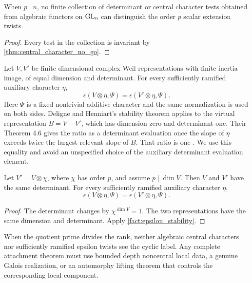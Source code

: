 \begin{corollary}\label{cor:rank_sieve_optimal}
When \(p\mid n\), no finite collection of determinant or central character tests obtained from algebraic functors on \(\operatorname{GL}_n\) can distinguish the order \(p\) scalar extension twists.
\end{corollary}

\begin{proof}
Every test in the collection is invariant by \cref{thm:central_character_no_go}.
\end{proof}

\begin{standardfact}\label{fact:epsilon_stability}
Let \(V,V'\) be finite dimensional complex Weil representations with finite inertia image, of equal dimension and determinant. For every sufficiently ramified auxiliary character \(\eta\),
\[
 \epsilon(V\otimes\eta,\Psi)=\epsilon(V'\otimes\eta,\Psi).
\]
Here \(\Psi\) is a fixed nontrivial additive character and the same normalization is used on both sides. Deligne and Henniart's stability theorem applies to the virtual representation \(B=V-V'\), which has dimension zero and determinant one. Their Theorem 4.6 gives the ratio as a determinant evaluation once the slope of \(\eta\) exceeds twice the largest relevant slope of \(B\). That ratio is one \cite{DeligneHenniart1981}. We use this equality and avoid an unspecified choice of the auxiliary determinant evaluation element.
\end{standardfact}

\begin{theorem}\label{thm:epsilon_no_go}
Let \(V' = V\otimes\chi\), where \(\chi\) has order \(p\), and assume \(p\mid\dim V\). Then \(V\) and \(V'\) have the same determinant. For every sufficiently ramified auxiliary character \(\eta\),
\[
\boxed{
 \epsilon(V\otimes\eta,\Psi)
 =
 \epsilon(V'\otimes\eta,\Psi).
}
\]
\end{theorem}

\begin{proof}
The determinant changes by \(\chi^{\dim V}=1\). The two representations have the same dimension and determinant. Apply \cref{fact:epsilon_stability}.
\end{proof}

\begin{remark}\label{rem:no_go_boundary}
When the quotient prime divides the rank, neither algebraic central characters nor sufficiently ramified epsilon twists see the cyclic label. Any complete attachment theorem must use bounded depth noncentral local data, a genuine Galois realization, or an automorphy lifting theorem that controls the corresponding local component.
\end{remark}

